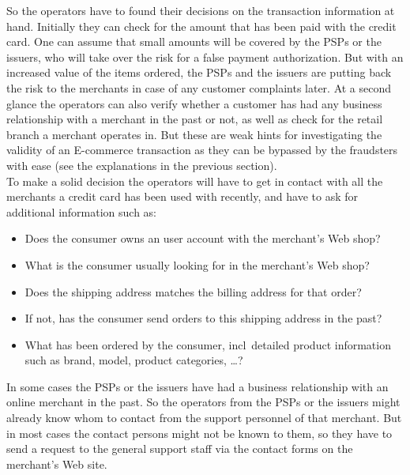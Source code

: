 So the operators have to found their decisions on the transaction information at hand. Initially they can check for the amount that has been paid with the credit card. One can assume that small amounts will be covered by the \gls{PSP}s or the issuers, who will take over the risk for a false payment authorization. But with an increased value of the items ordered, the \gls{PSP}s and the issuers are putting back the risk to the merchants in case of any customer complaints later. At a second glance the operators can also verify whether a customer has had any business relationship with a merchant in the past or not, as well as check for the retail branch a merchant operates in. But these are weak hints for investigating the validity of an \gls{E-commerce} transaction as they can be bypassed by the fraudsters with ease (see the explanations in the previous section). \\

To make a solid decision the operators will have to get in contact with all the merchants a credit card has been used with recently, and have to ask for additional information such as:\@

\begin{itemize}
  \item Does the consumer owns an user account with the merchant's Web shop?
  \item What is the consumer usually looking for in the merchant's Web shop?
  \item Does the shipping address matches the billing address for that order?
  \item If not, has the consumer send orders to this shipping address in the past?
  \item What has been ordered by the consumer, \gls{incl}\ detailed product information such as brand, model, product categories, \ldots?
\end{itemize}

In some cases the \gls{PSP}s or the issuers have had a business relationship with an online merchant in the past. So the operators from the \gls{PSP}s or the issuers might already know whom to contact from the support personnel of that merchant. But in most cases the contact persons might not be known to them, so they have to send a request to the general support staff via the contact forms on the merchant's Web site. \\

